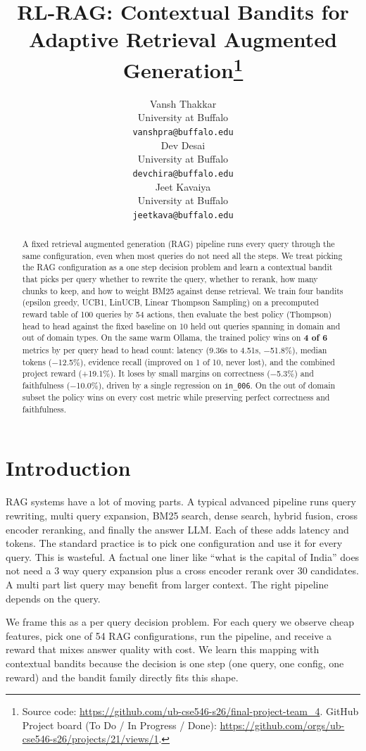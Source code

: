 \documentclass{article}
\title{RL-RAG: Contextual Bandits for Adaptive Retrieval Augmented Generation\thanks{Source code: \url{https://github.com/ub-cse546-s26/final-project-team_4}. GitHub Project board (To Do / In Progress / Done): \url{https://github.com/orgs/ub-cse546-s26/projects/21/views/1}.}}
\author{%
  Vansh Thakkar \\
  University at Buffalo \\
  \texttt{vanshpra@buffalo.edu} \\
  \And
  Dev Desai \\
  University at Buffalo \\
  \texttt{devchira@buffalo.edu} \\
  \And
  Jeet Kavaiya \\
  University at Buffalo \\
  \texttt{jeetkava@buffalo.edu} \\
}
\begin{document}
\maketitle

\begin{abstract}
A fixed retrieval augmented generation (RAG) pipeline runs every query through the same configuration, even when most queries do not need all the steps. We treat picking the RAG configuration as a one step decision problem and learn a contextual bandit that picks per query whether to rewrite the query, whether to rerank, how many chunks to keep, and how to weight BM25 against dense retrieval. We train four bandits (epsilon greedy, UCB1, LinUCB, Linear Thompson Sampling) on a precomputed reward table of 100 queries by 54 actions, then evaluate the best policy (Thompson) head to head against the fixed baseline on 10 held out queries spanning in domain and out of domain types. On the same warm Ollama, the trained policy wins on \textbf{4 of 6} metrics by per query head to head count: latency (9.36s to 4.51s, $-$51.8\%), median tokens ($-$12.5\%), evidence recall (improved on 1 of 10, never lost), and the combined project reward (+19.1\%). It loses by small margins on correctness ($-$5.3\%) and faithfulness ($-$10.0\%), driven by a single regression on \texttt{in\_006}. On the out of domain subset the policy wins on every cost metric while preserving perfect correctness and faithfulness.
\end{abstract}

\section{Introduction}

RAG systems have a lot of moving parts. A typical advanced pipeline runs query rewriting, multi query expansion, BM25 search, dense search, hybrid fusion, cross encoder reranking, and finally the answer LLM. Each of these adds latency and tokens. The standard practice is to pick one configuration and use it for every query. This is wasteful. A factual one liner like ``what is the capital of India'' does not need a 3 way query expansion plus a cross encoder rerank over 30 candidates. A multi part list query may benefit from larger context. The right pipeline depends on the query.

We frame this as a per query decision problem. For each query we observe cheap features, pick one of 54 RAG configurations, run the pipeline, and receive a reward that mixes answer quality with cost. We learn this mapping with contextual bandits because the decision is one step (one query, one config, one reward) and the bandit family directly fits this shape.
\end{document}
